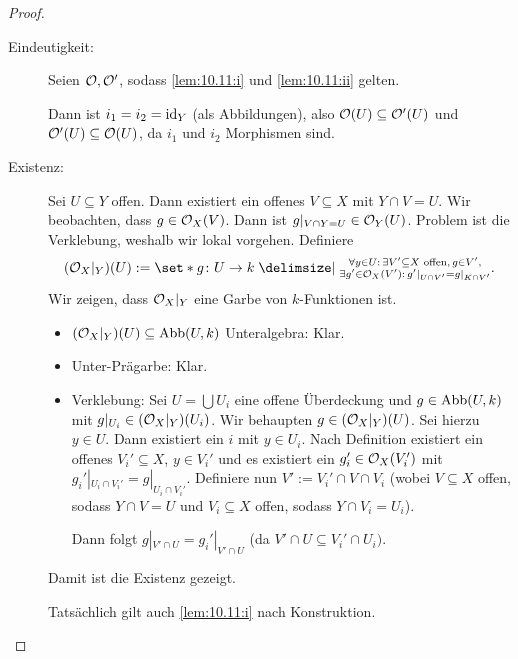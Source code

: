 \documentclass[12pt,a4paper]{scrartcl}
\theoremstyle{cplain}
\theoremstyle{cdef}
\begin{document}
\begin{proof}
	\leavevmode
	\begin{description}
		\item[Eindeutigkeit:] Seien $\mathcal{O}, \mathcal{O}'$, sodass \ref{lem:10.11:i} und \ref{lem:10.11:ii} gelten. 
		\begin{center}
		\end{center}
		Dann ist $i_1 = i_2 = \operatorname{id}_Y$ (als Abbildungen), also $\mathcal{O}(U) \subseteq \mathcal{O}'(U)$ und $\mathcal{O}'(U)\subseteq \mathcal{O}(U)$, da $i_1$ und $i_2$ Morphismen sind.


		\item[Existenz:] Sei $U\subseteq Y$ offen. Dann existiert ein offenes $V\subseteq X$ mit $Y\cap V = U$. Wir beobachten, dass $g\in\mathcal{O}_X(V)$. Dann ist $g|_{V\cap Y = U} \in \mathcal{O}_Y(U)$. Problem ist die Verklebung, weshalb wir lokal vorgehen. Definiere
		\[(\Os_X|_Y)(U) := \set*{g\colon U\to k\given \substack{\forall y\in U:\,\exists V'\subseteq X\text{ offen},\, g\in V', \\\exists g'\in \Os_X(V'):\, g'|_{U\cap V'} = g|_{K\cap V'}}}.\]
		Wir zeigen, dass $\mathcal{O}_X|_Y$ eine Garbe von $k$-Funktionen ist.
		\begin{itemize}
			\item $(\mathcal{O}_X|_Y)(U) \subseteq \operatorname{Abb}(U,k)$ Unteralgebra: Klar.
			\item Unter-Prägarbe: Klar.
			\item Verklebung: Sei $U = \bigcup U_i$ eine offene Überdeckung und $g\in \operatorname{Abb}(U,k)$ mit $g|_{U_i} \in (\mathcal{O}_X|_Y)(U_i)$. Wir behaupten $g\in (\mathcal{O}_X|_Y)(U)$. Sei hierzu $y\in U$. Dann existiert ein $i$ mit $y\in U_i$. Nach Definition existiert ein offenes $V_i'\subseteq X$, $y\in V_i'$ und es existiert ein $g_i'\in \mathcal{O}_X(V_i')$ mit $g_i'|_{U_i\cap V_i'} = g|_{U_i\cap V_i'}$. Definiere nun $V' := V_i'\cap V\cap V_i$ (wobei $V\subseteq X$ offen, sodass $Y\cap V = U$ und $V_i\subseteq X$ offen, sodass $Y\cap V_i = U_i$).
			
			Dann folgt $g|_{V'\cap U} = g_i'|_{V'\cap U}$ (da $V'\cap U\subseteq V_i'\cap U_i)$.
		\end{itemize}
		Damit ist die Existenz gezeigt.
		
		Tatsächlich gilt auch \ref{lem:10.11:i} nach Konstruktion.
		

\end{description}
\end{proof}
\end{document}
